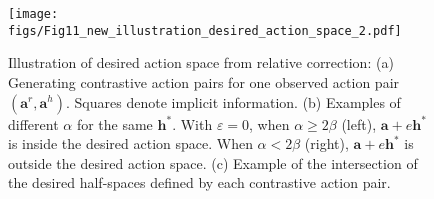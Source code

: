 \begin{figure}[t!]
	\centering
	\texttt{[image: figs/Fig11\_new\_illustration\_desired\_action\_space\_2.pdf]}
	\caption{
 Illustration of desired action space from relative correction: (a) Generating contrastive action pairs for one observed action pair $(\bm a^r, \bm a^h)$. 
 Squares denote implicit information.
 (b) Examples of different $\alpha$ for the same $\bm h^*$. 
  With $\varepsilon = 0$,  when $\alpha \geq 2 \beta$ (left), $\bm a+e\bm h^*$ is inside the desired action space. When $\alpha < 2 \beta$ (right), $\bm a+e\bm h^*$ is outside the desired action space. (c) Example of the intersection of the desired half-spaces defined by each contrastive action pair.}
\label{fig:Fig8AndFig9_explain_feasible_space}
\end{figure}


